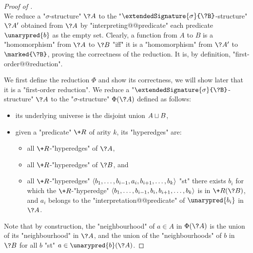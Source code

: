 \begin{proof}[Proof of ]
	\\
	We reduce a "$\sigma$-structure" $\?A$ to the
	"$\extendedSignature{\sigma}{\?B}$-structure" $\?A'$ obtained
	from $\?A$ by "interpreting@@predicate" each predicate $\unarypred{b}$ as the empty set.
	Clearly, a function from $A$ to $B$ is a "homomorphism" from $\?A$ to $\?B$
	"iff" it is a "homomorphism" from $\?A'$ to $\marked{\?B}$, proving the correctness
	of the reduction. It is, by definition, "first-order@@reduction".

	We first define the reduction $\Phi$ and show its correctness, we will show later that it
	is a "first-order reduction". We reduce a "$\extendedSignature{\sigma}{\?B}$-structure" $\?A$ to the "$\sigma$-structure"
	$\Phi(\?A)$ defined as follows:
	\begin{itemize}
		\item its underlying universe is the disjoint union $A \sqcup B$,
		\item given a "predicate" $\+R$ of arity $k$, its "hyperedges" are:
		\begin{itemize}
		\item all $\+R$-"hyperedges" of $\?A$,
		\item all $\+R$-"hyperedges" of $\?B$, and
		\item all $\+R$-"hyperedges" $\langle b_1,\hdots,b_{i-1}, a_i, b_{i+1},\hdots,b_k\rangle$
			"st" there exists $b_i$ for which the $\+R$-"hyperedge"
			$\langle b_1,\hdots,b_{i-1}, b_i, b_{i+1},\hdots,b_k\rangle$
			is in $\+R(\?B)$, and $a_i$ belongs to the "interpretation@@predicate" of 
			$\unarypred{b_i}$ in $\?A$.
		\end{itemize}
	\end{itemize}
	Note that by construction, the "neighbourhood" of $a \in A$ in $\Phi(\?A)$ is
	the union of its "neighbourhood" in $\?A$, and the union of the "neighbourhoods" of
	$b$ in $\?B$ for all $b$ "st" $a \in \unarypred{b}(\?A)$.


\end{proof}
